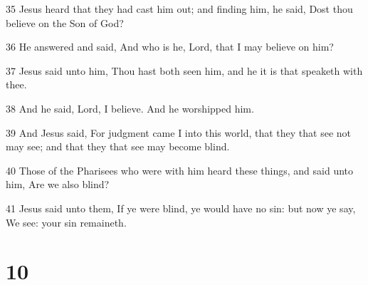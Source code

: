 \par 35 Jesus heard that they had cast him out; and finding him, he said, Dost thou believe on the Son of God?
\par 36 He answered and said, And who is he, Lord, that I may believe on him?
\par 37 Jesus said unto him, Thou hast both seen him, and he it is that speaketh with thee.
\par 38 And he said, Lord, I believe. And he worshipped him.
\par 39 And Jesus said, For judgment came I into this world, that they that see not may see; and that they that see may become blind.
\par 40 Those of the Pharisees who were with him heard these things, and said unto him, Are we also blind?
\par 41 Jesus said unto them, If ye were blind, ye would have no sin: but now ye say, We see: your sin remaineth.

\chapter{10}

